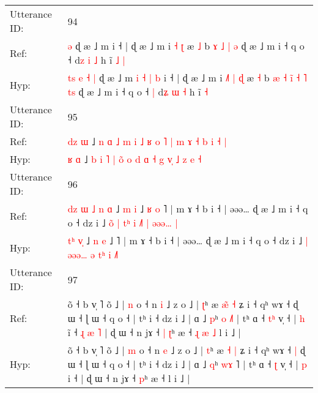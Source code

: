 \documentclass[10pt]{article}
\DeclareRobustCommand{\hl}[1]{{\textcolor{red}{#1}}}
\begin{document}
\begin{longtable}{ll}
\midrule
Utterance ID: & 94 \\
Ref: & \hl{}\hl{}\hl{}\hl{}\hl{}\hl{}\hl{}\hl{ə} ɖ æ ˩ m\hl{}\hl{}\hl{}\hl{}\hl{}\hl{}\hl{}\hl{} i ˧ | ɖ æ ˩ m i\hl{}\hl{}\hl{} \hl{˧} \hl{ʈ} æ \hl{˩} b\hl{}\hl{}\hl{}\hl{} \hl{}\hl{ɤ} \hl{˩} \hl{|} \hl{}\hl{ə} ɖ æ ˩ m i ˧ q o ˧\hl{}\hl{} d\hl{z} \hl{i} \hl{˩} h ĩ\hl{ }\hl{˩} \hl{|}
 \\
Hyp: & \hl{t}\hl{s}\hl{ }\hl{e}\hl{ }\hl{˧}\hl{ }\hl{|} ɖ æ ˩ m\hl{ }\hl{i}\hl{ }\hl{˧}\hl{ }\hl{|}\hl{ }\hl{b} i ˧ | ɖ æ ˩ m i\hl{ }\hl{˩}\hl{˥} \hl{|} \hl{ɖ} æ \hl{˧} b\hl{ }\hl{æ}\hl{ }\hl{˧} \hl{i}\hl{̃} \hl{˧} \hl{˥} \hl{t}\hl{s} ɖ æ ˩ m i ˧ q o ˧\hl{ }\hl{|} d\hl{ʑ} \hl{ɯ} \hl{˧} h ĩ\hl{}\hl{} \hl{˧}
 \\
\midrule
Utterance ID: & 95 \\
Ref: & \hl{d}\hl{z} \hl{ɯ} ˩ \hl{n} \hl{ɑ} \hl{˩} \hl{m} \hl{i}\hl{ }\hl{˩} \hl{ʁ} \hl{o} \hl{˥} \hl{|} \hl{m} \hl{ɤ}\hl{ }\hl{˧} \hl{b} \hl{i} \hl{˧} \hl{|}
 \\
Hyp: & \hl{}\hl{ʁ} \hl{ɑ} ˩ \hl{b} \hl{i} \hl{˥} \hl{|} \hl{}\hl{o}\hl{̃} \hl{o} \hl{d} \hl{ɑ} \hl{˧} \hl{g} \hl{}\hl{v}\hl{̩} \hl{˩} \hl{z} \hl{e} \hl{˧}
 \\
\midrule
Utterance ID: & 96 \\
Ref: & \hl{d}\hl{z}\hl{ }\hl{ɯ}\hl{ }\hl{˩} \hl{n}\hl{ }\hl{ɑ} ˩ \hl{m} \hl{i} ˩\hl{ }\hl{ʁ}\hl{ }\hl{o} ˥ | m ɤ ˧ b i ˧ | əəə… ɖ æ ˩ m i ˧ q o ˧ dz i ˩ \hl{o}\hl{̃} \hl{|}\hl{ }\hl{t}\hl{ʰ} \hl{i} \hl{˩}\hl{˥} \hl{|} \hl{ə}\hl{ə}\hl{ə}\hl{…}\hl{ }\hl{|}
 \\
Hyp: & \hl{}\hl{}\hl{}\hl{}\hl{t}\hl{ʰ} \hl{}\hl{v}\hl{̩} ˩ \hl{n} \hl{e} ˩\hl{}\hl{}\hl{}\hl{} ˥ | m ɤ ˧ b i ˧ | əəə… ɖ æ ˩ m i ˧ q o ˧ dz i ˩ \hl{}\hl{|} \hl{ə}\hl{ə}\hl{ə}\hl{…} \hl{ə} \hl{t}\hl{ʰ} \hl{i} \hl{}\hl{}\hl{}\hl{}\hl{˩}\hl{˥}
 \\
\midrule
Utterance ID: & 97 \\
Ref: & õ ˧ b v̩ ˥ õ ˩ | \hl{n} o ˧ n \hl{i} ˩ z o ˩ | \hl{ʈ}ʰ æ \hl{æ}\hl{̃} \hl{˧} ʑ i ˧ qʰ wɤ ˧\hl{}\hl{} ɖ ɯ ˧ ɭ ɯ ˧ q o ˧ | tʰ i ˧ dz i ˩ | ɑ ˩ \hl{p}ʰ \hl{o}\hl{ }\hl{˩}˥ | tʰ ɑ ˧ \hl{t}\hl{ʰ} v̩ ˧ | \hl{h} i\hl{̃} ˧\hl{ }\hl{ɻ}\hl{ }\hl{æ}\hl{ }\hl{˥} | ɖ ɯ ˧ n jɤ ˧\hl{ }\hl{|} \hl{ʈ}ʰ æ ˧\hl{ }\hl{ɻ}\hl{ }\hl{æ}\hl{ }\hl{˩} l i ˩ |
 \\
Hyp: & õ ˧ b v̩ ˥ õ ˩ | \hl{m} o ˧ n \hl{e} ˩ z o ˩ | \hl{t}ʰ æ \hl{}\hl{˧} \hl{|} ʑ i ˧ qʰ wɤ ˧\hl{ }\hl{|} ɖ ɯ ˧ ɭ ɯ ˧ q o ˧ | tʰ i ˧ dz i ˩ | ɑ ˩ \hl{q}ʰ \hl{w}\hl{ɤ}\hl{ }˥ | tʰ ɑ ˧ \hl{}\hl{ʈ} v̩ ˧ | \hl{p} i\hl{} ˧\hl{}\hl{}\hl{}\hl{}\hl{}\hl{} | ɖ ɯ ˧ n jɤ ˧\hl{}\hl{} \hl{p}ʰ æ ˧\hl{}\hl{}\hl{}\hl{}\hl{}\hl{} l i ˩ |

\end{longtable}
\end{document}
